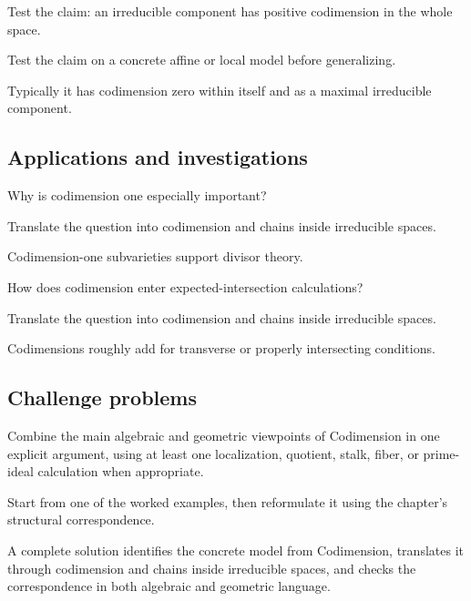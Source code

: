 \begin{exercise}\label{exr:vi31-expand-12}
Test the claim: an irreducible component has positive codimension in the whole space.
\end{exercise}
\begin{hint}
Test the claim on a concrete affine or local model before generalizing.
\end{hint}
\begin{solution}
Typically it has codimension zero within itself and as a maximal irreducible component.
\end{solution}

\subsection*{Applications and investigations}

\begin{exercise}[Divisors]\label{exr:vi31-expand-13}
Why is codimension one especially important?
\end{exercise}
\begin{hint}
Translate the question into codimension and chains inside irreducible spaces.
\end{hint}
\begin{solution}
Codimension-one subvarieties support divisor theory.
\end{solution}

\begin{exercise}\label{exr:vi31-expand-14}
How does codimension enter expected-intersection calculations?
\end{exercise}
\begin{hint}
Translate the question into codimension and chains inside irreducible spaces.
\end{hint}
\begin{solution}
Codimensions roughly add for transverse or properly intersecting conditions.
\end{solution}

\subsection*{Challenge problems}

\begin{exercise}\label{exr:vi31-expand-15}
Combine the main algebraic and geometric viewpoints of Codimension in one explicit argument, using at least one localization, quotient, stalk, fiber, or prime-ideal calculation when appropriate.
\end{exercise}
\begin{hint}
Start from one of the worked examples, then reformulate it using the chapter's structural correspondence.
\end{hint}
\begin{solution}
A complete solution identifies the concrete model from Codimension, translates it through codimension and chains inside irreducible spaces, and checks the correspondence in both algebraic and geometric language.
\end{solution}

